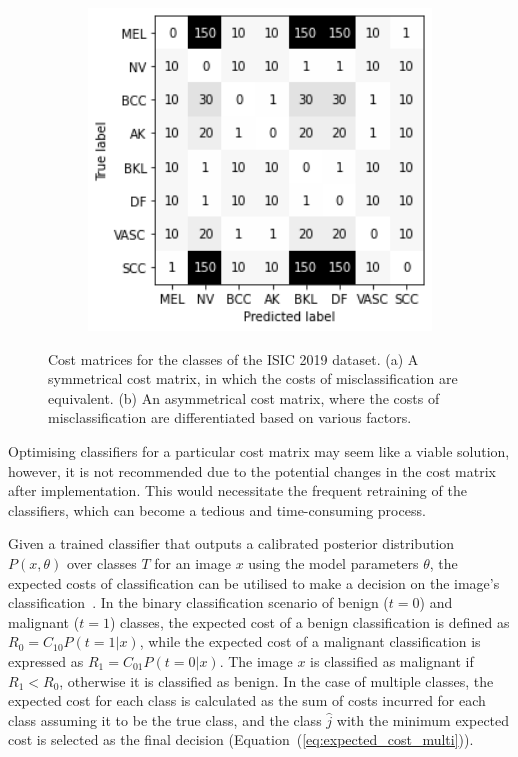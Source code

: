 \begin{figure}[!h]
\begin{subfigure}{0.49\textwidth}
		\includegraphics[width=1\textwidth]{images/cost_matrix_2.png}
		\caption{}
		\label{fig:multiclassasymcosts}
	\end{subfigure}
	\caption{Cost matrices for the classes of the ISIC 2019 dataset. (a) A symmetrical cost matrix, in which the costs of misclassification are equivalent. (b) An asymmetrical cost matrix, where the costs of misclassification are differentiated based on various factors.}
	\label{fig:multiclasscosts}
\end{figure}

Optimising classifiers for a particular cost matrix may seem like a viable solution, however, it is not recommended due to the potential changes in the cost matrix after implementation. This would necessitate the frequent retraining of the classifiers, which can become a tedious and time-consuming process.

Given a trained classifier that outputs a calibrated posterior distribution $P(x, \theta)$ over classes $T$ for an image $x$ using the model parameters $\theta$, the expected costs of classification can be utilised to make a decision on the image's classification~\citep{ferrer2022analysis}. In the binary classification scenario of benign ($t=0$) and malignant ($t=1$) classes, the expected cost of a benign classification is defined as $R_0 = C_{10} P(t=1|x)$, while the expected cost of a malignant classification is expressed as $R_1 = C_{01} P(t=0|x)$. The image $x$ is classified as malignant if $R_1 < R_0$, otherwise it is classified as benign. In the case of multiple classes, the expected cost for each class is calculated as the sum of costs incurred for each class assuming it to be the true class, and the class $\hat{j}$ with the minimum expected cost is selected as the final decision (Equation~(\ref{eq:expected_cost_multi})).

